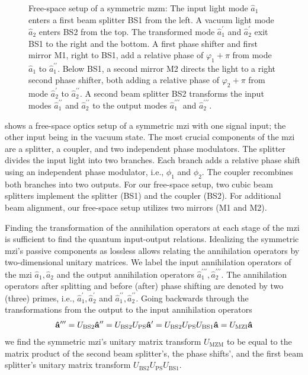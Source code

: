 \begin{figure}[htb]
	\centering
	
	\caption{Free-space setup of a symmetric \gls{mzm}: The input light mode $\hat{a}_1$ enters a first beam splitter BS1 from the left. A vacuum light mode $\hat{a}_2$ enters BS2 from the top. The transformed mode $\hat{a}_1^\prime$ and $\hat{a}_2^\prime$ exit BS1 to the right and the bottom. A first phase shifter and first mirror M1, right to BS1, add a relative phase of $\varphi_1+\pi$ from mode $\hat{a}_1$ to $\hat{a}_1^{\prime\prime}$. Below BS1, a second mirror M2 directs the light to a right second phase shifter, both adding a relative phase of $\varphi_2+\pi$ from mode $\hat{a}_2^\prime$ to $\hat{a}_2^{\prime\prime}$. A second beam splitter BS2 transforms the input modes $\hat{a}_1^{\prime\prime}$ and $\hat{a}_2^{\prime\prime}$ to the output modes $\hat{a}_1^{\prime\prime\prime}$ and $\hat{a}_2^{\prime\prime\prime}$.}\label{fig:mzi_symmetric}
\end{figure}
 shows a free-space optics setup of a symmetric \gls{mzi} with one signal input; the other input being in the vacuum state.
The most crucial components of the \gls{mzi} are a splitter, a coupler, and two independent phase modulators.
The splitter divides the input light into two branches.
Each branch adds a relative phase shift using an independent phase modulator, i.e., $\phi_1$ and $\phi_2$.
The coupler recombines both branches into two outputs.
For our free-space setup, two cubic beam splitters implement the splitter (BS1) and the coupler (BS2).
For additional beam alignment, our free-space setup utilizes two mirrors (M1 and M2).

Finding the transformation of the annihilation operators at each stage of the \gls{mzi} is sufficient to find the quantum input-output relations.
Idealizing the symmetric \gls{mzi}'s passive components as lossless allows relating the annihilation operators by two-dimensional unitary matrices.
We label the input annihilation operators of the \gls{mzi} $\hat{a}_1,\hat{a}_2$ and the output annihilation operators $\hat{a}_1^{\prime\prime\prime},\hat{a}_2^{\prime\prime\prime}$.
The annihilation operators after splitting and before (after) phase shifting are denoted by two (three) primes, i.e., $\hat{a}_1^{\prime},\hat{a}_2^{\prime}$ and $\hat{a}_1^{\prime\prime},\hat{a}_2^{\prime\prime}$.
Going backwards through the transformations from the output to the input annihilation operators
\begin{equation}
	\begin{split}
		\vb{\hat{a}}^{\prime\prime\prime}
		=
		U_\text{BS2}
		\vb{\hat{a}}^{\prime\prime}
		=
		U_\text{BS2}
		U_\text{PS}
		\vb{\hat{a}}^{\prime}
		=
		U_\text{BS2}
		U_\text{PS}
		U_\text{BS1}
		\vb{\hat{a}}
		=
		U_\text{MZI}
		\vb{\hat{a}}
	\end{split}
\end{equation}
we find the symmetric \gls{mzi}'s unitary matrix transform $U_\text{MZM}$ to be equal to the matrix product of the second beam splitter's, the phase shifts', and the first beam splitter's unitary matrix transform  $U_\text{BS2}U_\text{PS}U_\text{BS1}$.

